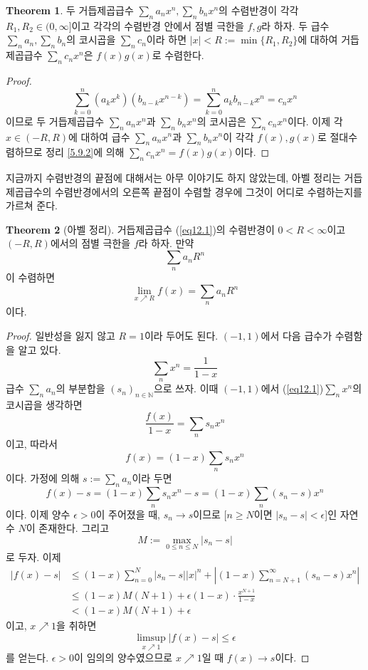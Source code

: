 \documentclass[11pt]{book}
\numberwithin{equation}{chapter}
\def\NN{\mathbb{N}}
\def\eps{\epsilon}
\newcommand{\abs}[1]{\left\vert#1\right\vert}
\theoremstyle{definition}
\newtheorem{thm}{Theorem}[section]
\begin{document}
\begin{thm}
    두 거듭제곱급수 \(\sum_n a_n x^n, \sum_n b_n x^n\)의 수렴반경이 각각 \(R_1, R_2 \in (0, \infty]\)이고 각각의 수렴반경 안에서 점별 극한을 \(f, g\)라 하자. 두 급수 \(\sum_n a_n, \sum_n b_n\)의 코시곱을 \(\sum_n c_n\)이라 하면 \(\abs{x} < R := \min \{R_1, R_2\}\)에 대하여 거듭제곱급수 \(\sum_n c_n x^n\)은 \(f(x)g(x)\)로 수렴한다.
\end{thm}
\begin{proof}
    \[
        \sum_{k=0}^n (a_k x^k) (b_{n-k} x^{n-k}) = \sum_{k=0}^n a_k b_{n-k} x^n = c_n x^n
    \]
    이므로 두 거듭제곱급수 \(\sum_n a_n x^n\)과 \(\sum_n b_n x^n\)의 코시곱은 \(\sum_n c_n x^n\)이다. 이제 각 \(x \in (-R, R)\)에 대하여 급수 \(\sum_n a_n x^n\)과 \(\sum_n b_n x^n\)이 각각 \(f(x), g(x)\)로 절대수렴하므로 정리 \ref{5.9.2}에 의해 \(\sum_n c_n x^n = f(x)g(x)\)이다.
\end{proof}

지금까지 수렴반경의 끝점에 대해서는 아무 이야기도 하지 않았는데, 아벨 정리는 거듭제곱급수의 수렴반경에서의 오른쪽 끝점이 수렴할 경우에 그것이 어디로 수렴하는지를 가르쳐 준다.

\begin{thm}[아벨 정리] \label{12.3.8}
    거듭제곱급수 (\ref{eq12.1})의 수렴반경이 \(0 < R < \infty\)이고 \((-R, R)\)에서의 점별 극한을 \(f\)라 하자. 만약
    \[
    \sum_n a_n R^n    
    \]
    이 수렴하면
    \[
    \lim_{x \nearrow R} f(x) = \sum_n a_n R^n    
    \]
    이다.
\end{thm}
\begin{proof}
    일반성을 잃지 않고 \(R = 1\)이라 두어도 된다. \((-1, 1)\)에서 다음 급수가 수렴함을 알고 있다.
    \[
    \sum_n x^n = \frac{1}{1-x}    
    \]
    급수 \(\sum_n a_n\)의 부분합을 \((s_n)_{n \in \NN}\)으로 쓰자. 이때 \((-1, 1)\)에서 (\ref{eq12.1})\과 \(\sum_n x^n\)의 코시곱을 생각하면
    \[
    \frac{f(x)}{1-x} = \sum_n s_n x^n
    \]
    이고, 따라서
    \[
    f(x) = (1-x) \sum_n s_n x^n    
    \]
    이다. 가정에 의해 \(s := \sum_n a_n\)이라 두면
    \[
    f(x) - s = (1-x) \sum_n s_n x^n  - s = (1-x) \sum_n (s_n - s) x^n   
    \]
    이다. 이제 양수 \(\eps > 0\)이 주어졌을 때, \(s_n \to s\)이므로 [\(n \ge N\)이면 \(\abs{s_n - s} < \eps\)]인 자연수 \(N\)이 존재한다. 그리고
    \[
    M := \max_{0 \le n \le N} \abs{s_n - s}    
    \]
    로 두자. 이제
    \begin{align*}
        \abs{f(x) - s} &\le (1-x) \sum_{n=0}^N \abs{s_n - s}\abs{x}^n + \abs{(1-x) \sum_{n=N+1}^\infty (s_n - s) x^n}\\
        &\le (1-x)M(N+1) + \eps(1-x)\cdot \frac{x^{N+1}}{1-x}\\
        &< (1-x)M(N+1) + \eps
    \end{align*}
    이고, \(x \nearrow 1\)을 취하면
    \[
    \limsup_{x \nearrow 1} \abs{f(x) - s} \le \eps    
    \]
    를 얻는다. \(\eps > 0\)이 임의의 양수였으므로 \(x \nearrow 1\)일 때 \(f(x) \to s\)이다.
\end{proof}
\end{document}
